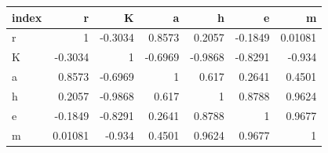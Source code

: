 \begin{tabular}{lrrrrrr}
\toprule
index & r & K & a & h & e & m \\
\midrule
r & 1 & -0.3034 & 0.8573 & 0.2057 & -0.1849 & 0.01081 \\
K & -0.3034 & 1 & -0.6969 & -0.9868 & -0.8291 & -0.934 \\
a & 0.8573 & -0.6969 & 1 & 0.617 & 0.2641 & 0.4501 \\
h & 0.2057 & -0.9868 & 0.617 & 1 & 0.8788 & 0.9624 \\
e & -0.1849 & -0.8291 & 0.2641 & 0.8788 & 1 & 0.9677 \\
m & 0.01081 & -0.934 & 0.4501 & 0.9624 & 0.9677 & 1 \\
\bottomrule
\end{tabular}
